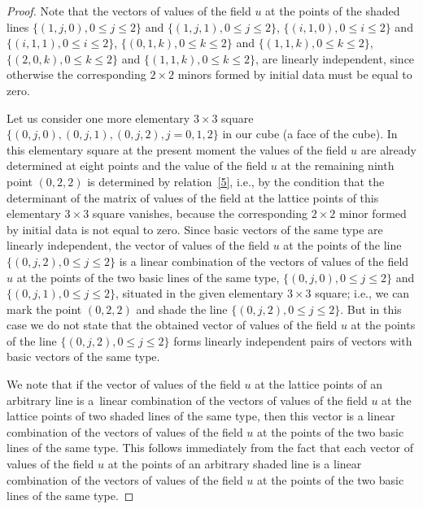 \begin{proof}
Note that the vectors of values of the f\/ield $u$ at the points of
the shaded lines $\{(1, j, 0), 0 \leq j \leq 2\}$ and $\{(1, j, 1),
0 \leq j \leq 2\}$, $\{(i, 1, 0), 0 \leq i \leq 2\}$ and $\{(i, 1,
1), 0 \leq i \leq 2\}$, $\{(0, 1, k), 0 \leq k \leq 2\}$ and $\{(1,
1, k), 0 \leq k \leq 2\}$, $\{(2, 0, k), 0 \leq k \leq 2\}$ and
$\{(1, 1, k), 0 \leq k \leq 2\}$, are linearly independent, since
otherwise the corresponding $2 \times 2$ minors formed by initial
data must be equal to zero.



Let us consider one more elementary $3 \times 3$ square $\{(0, j,
0), (0, j, 1), (0, j, 2), j = 0, 1, 2\}$ in our cube (a face of the
cube). In this elementary square at the present moment the values of
the f\/ield $u$ are already determined at eight points and the value
of the f\/ield $u$ at the remaining ninth point $(0, 2, 2)$ is
determined by relation~\eqref{5}, i.e., by the condition that
the determinant of the matrix of values of the f\/ield at the lattice
points of this elementary $3 \times 3$ square vanishes, because the
corresponding $2 \times 2$ minor formed by initial data is not equal
to zero. Since basic vectors of the same type are linearly
independent, the vector of values of the f\/ield $u$ at the points of
the line $\{(0, j, 2), 0 \leq j \leq 2\}$ is a linear combination of
the vectors of values of the f\/ield $u$ at the points of the two
basic lines of the same type, $\{(0, j, 0), 0 \leq j \leq 2\}$ and
$\{(0, j, 1), 0 \leq j \leq 2\}$, situated in the given elementary
$3 \times 3$ square; i.e., we can mark the point $(0, 2, 2)$ and
shade the line $\{(0, j, 2), 0 \leq j \leq 2\}$. But in this case we
do not state that the obtained vector of values of the f\/ield $u$ at
the points of the line $\{(0, j, 2), 0 \leq j \leq 2\}$ forms
linearly independent pairs of vectors with basic vectors of the same
type.



We note that if the vector of values of the f\/ield $u$ at the lattice
points of an arbitrary line is a~linear combination of the vectors
of values of the f\/ield $u$ at the lattice points of two shaded lines
of the same type, then this vector is a linear combination of the
vectors of values of the f\/ield $u$ at the points of the two basic
lines of the same type. This follows immediately from the fact that
each vector of values of the f\/ield $u$ at the points of an arbitrary
shaded line is a linear combination of the vectors of values of the
f\/ield $u$ at the points of the two basic lines of the same type.


\end{proof}
